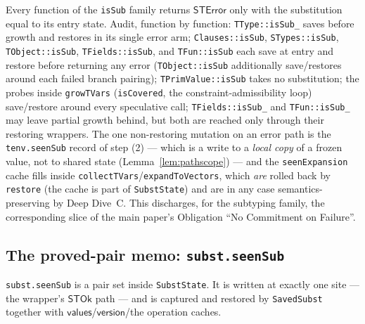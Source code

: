 \documentclass[11pt]{article}
\newcommand{\STOk}{\mathsf{STOk}}
\newcommand{\STErr}{\mathsf{STError}}
\newcommand{\vals}{\mathsf{values}}
\newcommand{\ver}{\mathsf{version}}
\begin{document}
\begin{lemma}
\label{lem:restore}
Every function of the \texttt{isSub} family returns $\STErr$ only with
the substitution equal to its entry state. Audit, function by function:
\texttt{TType::isSub\_} saves before growth and restores in its single
error arm; \texttt{Clauses::isSub}, \texttt{STypes::isSub},
\texttt{TObject::isSub}, \texttt{TFields::isSub}, and \texttt{TFun::isSub}
each save at entry and restore before returning any error
(\texttt{TObject::isSub} additionally save/restores around each failed
branch pairing); \texttt{TPrimValue::isSub} takes no substitution;
the probes inside \texttt{growTVars} (\texttt{isCovered}, the
constraint-admissibility loop) save/restore around every speculative
call; \texttt{TFields::isSub\_} and \texttt{TFun::isSub\_} may leave
partial growth behind, but both are reached only through their restoring
wrappers. The one non-restoring mutation on an error path is the
\texttt{tenv.seenSub} record of step (2) --- which is a write to a
\emph{local copy} of a frozen value, not to shared state
(Lemma~\ref{lem:pathscope}) --- and the \texttt{seenExpansion} cache
fills inside \texttt{collectTVars}/\texttt{expandToVectors}, which
\emph{are} rolled back by \texttt{restore} (the cache is part of
\texttt{SubstState}) and are in any case semantics-preserving by Deep
Dive~C. This discharges, for the subtyping family, the corresponding
slice of the main paper's Obligation ``No Commitment on Failure''.
\end{lemma}

\subsection{The proved-pair memo: \texttt{subst.seenSub}}
\label{sec:substseen}

\begin{definition}
\label{def:memo}
\texttt{subst.seenSub} is a pair set inside \texttt{SubstState}. It is
written at exactly one site --- the wrapper's $\STOk$ path --- and is
captured and restored by \texttt{SavedSubst} together with
$\vals$/$\ver$/the operation caches.
\end{definition}
\end{document}
